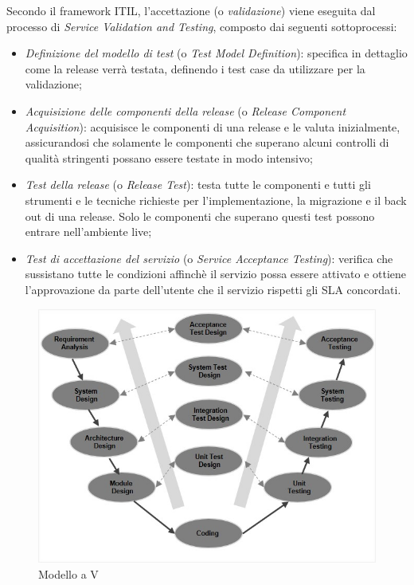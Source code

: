 	Secondo il framework ITIL, l'accettazione (o \textit{validazione}) viene eseguita dal processo di \textit{Service Validation and Testing}, composto dai seguenti sottoprocessi:
	\begin{itemize}[noitemsep]
		\item \textit{Definizione del modello di test} (o \textit{Test Model Definition}): specifica in dettaglio come la release verrà testata, definendo i test case da utilizzare per la validazione; 
		\item \textit{Acquisizione delle componenti della release} (o \textit{Release Component Acquisition}): acquisisce le componenti di una release e le valuta inizialmente, assicurandosi che solamente le componenti che superano alcuni controlli di qualità stringenti possano essere testate in modo intensivo;
		\item \textit{Test della release} (o \textit{Release Test}): testa tutte le componenti e tutti gli strumenti e le tecniche richieste per l’implementazione, la migrazione e il back out di una release. Solo le componenti che superano questi test possono entrare nell’ambiente live;
		\item \textit{Test di accettazione del servizio} (o \textit{Service Acceptance Testing}): verifica che sussistano tutte le condizioni affinchè il servizio possa essere attivato e ottiene l'approvazione da parte dell'utente che il servizio rispetti gli SLA concordati.
	\end{itemize}
	
	\begin{figure}[h!]
		\centering
		\includegraphics[width=\linewidth-2cm]{img/sdlc_v_model.jpeg}
		\caption{Modello a V\cite{vmodel}}
		\label{fig:vmodel}
	\end{figure}

